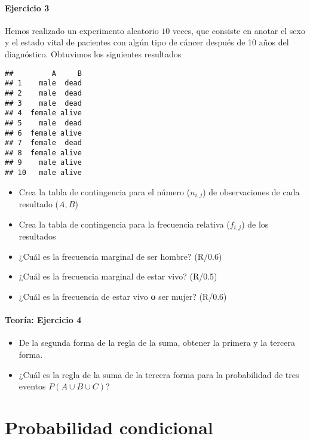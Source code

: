 \documentclass[
]{book}
\providecommand{\tightlist}{%
  \setlength{\itemsep}{0pt}\setlength{\parskip}{0pt}}
\begin{document}
\hypertarget{ejercicio-3}{%
\subsubsection{Ejercicio 3}\label{ejercicio-3}}

Hemos realizado un experimento aleatorio \(10\) veces, que consiste en anotar el sexo y el estado vital de pacientes con algún tipo de cáncer después de 10 años del diagnóstico. Obtuvimos los siguientes resultados

\begin{verbatim}
##         A     B
## 1    male  dead
## 2    male  dead
## 3    male  dead
## 4  female alive
## 5    male  dead
## 6  female alive
## 7  female  dead
## 8  female alive
## 9    male alive
## 10   male alive
\end{verbatim}

\begin{itemize}
\tightlist
\item
  Crea la tabla de contingencia para el número (\(n_{i,j}\)) de observaciones de cada resultado (\(A,B\))
\item
  Crea la tabla de contingencia para la frecuencia relativa (\(f_{i,j}\)) de los resultados
\item
  ¿Cuál es la frecuencia marginal de ser hombre? (R/0.6)
\item
  ¿Cuál es la frecuencia marginal de estar vivo? (R/0.5)
\item
  ¿Cuál es la frecuencia de estar vivo \textbf{o} ser mujer? (R/0.6)
\end{itemize}

\hypertarget{teoruxeda-ejercicio-4}{%
\subsubsection{Teoría: Ejercicio 4}\label{teoruxeda-ejercicio-4}}

\begin{itemize}
\item
  De la segunda forma de la regla de la suma, obtener la primera y la tercera forma.
\item
  ¿Cuál es la regla de la suma de la tercera forma para la probabilidad de tres eventos \(P(A \cup B \cup C)\)?
\end{itemize}

\hypertarget{probabilidad-condicional}{%
\chapter{Probabilidad condicional}\label{probabilidad-condicional}}
\end{document}
